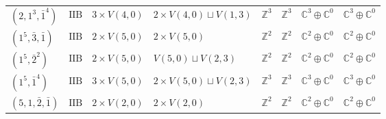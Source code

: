 \documentclass[11pt,a4paper]{article}
\begin{document}
\begin{appendix}
\begin{table}
\begin{tabular}{C{2.65cm}C{0.85cm}C{3.0cm}C{3.0cm}C{2.25cm}C{2.25cm}C{1.55cm}C{1.55cm}}
\((2, 1^{3}, \bar{1}^{4})\) & \(\mathrm{IIB}\) & \(3 \times V(4,0)\) & \(2 \times V(4,0) \sqcup V(1,3)\) & \(\mathbb{Z}^{3}\) & \(\mathbb{Z}^{3}\) & \(\mathbb{C}^{3} \oplus \mathbb{C}^{0}\) & \(\mathbb{C}^{3} \oplus \mathbb{C}^{0}\) \\
\((1^{5}, \bar{3}, \bar{1})\) & \(\mathrm{IIB}\) & \(2 \times V(5,0)\) & \(2 \times V(5,0)\) & \(\mathbb{Z}^{2}\) & \(\mathbb{Z}^{2}\) & \(\mathbb{C}^{2} \oplus \mathbb{C}^{0}\) & \(\mathbb{C}^{2} \oplus \mathbb{C}^{0}\) \\
\((1^{5}, \bar{2}^{2})\) & \(\mathrm{IIB}\) & \(2 \times V(5,0)\) & \(V(5,0) \sqcup V(2,3)\) & \(\mathbb{Z}^{2}\) & \(\mathbb{Z}^{2}\) & \(\mathbb{C}^{2} \oplus \mathbb{C}^{0}\) & \(\mathbb{C}^{2} \oplus \mathbb{C}^{0}\) \\
\((1^{5}, \bar{1}^{4})\) & \(\mathrm{IIB}\) & \(3 \times V(5,0)\) & \(2 \times V(5,0) \sqcup V(2,3)\) & \(\mathbb{Z}^{3}\) & \(\mathbb{Z}^{3}\) & \(\mathbb{C}^{3} \oplus \mathbb{C}^{0}\) & \(\mathbb{C}^{3} \oplus \mathbb{C}^{0}\) \\
\((5, 1, \bar{2}, \bar{1})\) & \(\mathrm{IIB}\) & \(2 \times V(2,0)\) & \(2 \times V(2,0)\) & \(\mathbb{Z}^{2}\) & \(\mathbb{Z}^{2}\) & \(\mathbb{C}^{2} \oplus \mathbb{C}^{0}\) & \(\mathbb{C}^{2} \oplus \mathbb{C}^{0}\) \\
\bottomrule
\end{tabular}
\end{table}



\end{appendix}
\end{document}
